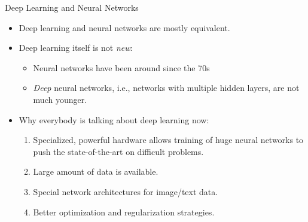 \begin{frame} {Deep Learning and Neural Networks}
\begin{itemize}
\item Deep learning and neural networks are mostly equivalent.
\vspace{.3cm}
\item Deep learning itself is not \textit{new}:
\begin{itemize}
\item Neural networks have been around since the 70s
\item \textit{Deep} neural networks, i.e., networks with multiple hidden layers, are not much younger.
\end{itemize}
\vspace{.3cm}
\item Why everybody is talking about deep learning now:
\begin{enumerate}
\vspace{.1cm}
\item Specialized, powerful hardware allows training of huge neural networks to push the state-of-the-art on difficult problems.
\vspace{.2cm}
\item Large amount of data is available.
\vspace{.2cm}
\item Special network architectures for image/text data.
\vspace{.2cm}
\item Better optimization and regularization strategies.
\end{enumerate}
\end{itemize}
\end{frame}

